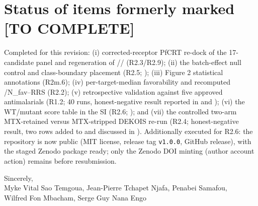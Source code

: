 \documentclass[11pt]{article}
\begin{document}
\section*{Status of items formerly marked [TO COMPLETE]}
Completed for this revision: (i) corrected-receptor PfCRT re-dock of the 17-candidate panel
and regeneration of // (R2.3/R2.9); (ii) the batch-effect null
control and class-boundary placement (R2.5; ); (iii) Figure 2 statistical
annotations (R2m.6); (iv) per-target-median favorability and recomputed
/N\_fav--RRS (R2.2); (v) retrospective validation against five approved
antimalarials (R1.2; 40 runs, honest-negative result reported in  and
); (vi) the WT/mutant score table in the SI (R2.6;
); and (vii) the controlled two-arm MTX-retained versus
MTX-stripped DEKOIS re-run (R2.4; honest-negative result, two rows added to
 and discussed in ).
Additionally executed for R2.6: the repository is now public (MIT license, release tag
\texttt{v1.0.0}, GitHub release), with the staged Zenodo package ready; only the Zenodo DOI
minting (author account action) remains before resubmission.

\vspace{2em}
\noindent Sincerely,\\
Myke Vital Sao Temgoua, Jean-Pierre Tchapet Njafa, Penabei Samafou,\\
Wilfred Fon Mbacham, Serge Guy Nana Engo
\end{document}
